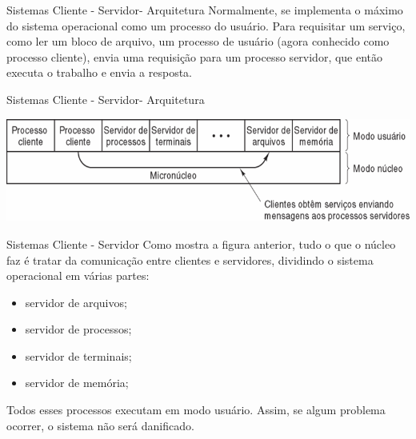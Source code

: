 \documentclass{beamer}
\begin{document}
\begin{frame}{Sistemas Cliente - Servidor- Arquitetura }
    Normalmente, se implementa o máximo do sistema operacional como um processo do usuário. Para requisitar um serviço, como ler um bloco de arquivo, um processo de usuário (agora conhecido como processo cliente), envia uma requisição para um processo servidor, que então executa o trabalho e envia a resposta.
\end{frame}
\begin{frame}{Sistemas Cliente - Servidor- Arquitetura}

    \vspace{1cm}
    \begin{center}
        \includegraphics[width=0.8\linewidth]{assets/aula-tads-sope/SO-cli-ser-1.png} %
    \end{center}
\end{frame}
\begin{frame}{Sistemas Cliente - Servidor}
    Como mostra a figura anterior, tudo o que o núcleo faz é tratar da comunicação entre clientes e servidores, dividindo o sistema operacional em várias partes:

    \begin{itemize}
        \item servidor de arquivos;
        \item servidor de processos;
        \item servidor de terminais;
        \item servidor de memória;
    \end{itemize}

    Todos esses processos executam em modo usuário. Assim, se algum problema ocorrer, o sistema não será danificado.
\end{frame}
\end{document}
